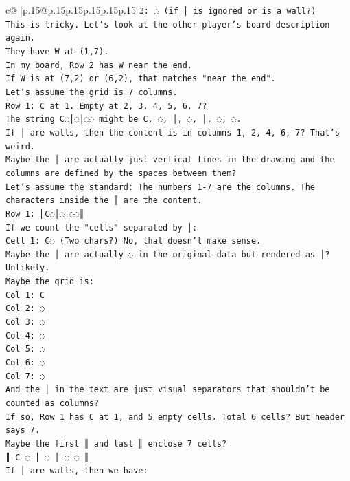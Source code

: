 \documentclass{article}
\begin{document}
{\begin{supertabular}{c@{$\;$}|p{.15\linewidth}@{}p{.15\linewidth}p{.15\linewidth}p{.15\linewidth}p{.15\linewidth}p{.15\linewidth}}
{{{\texttt{3: ◌ (if │ is ignored or is a wall?)} \\
\texttt{This is tricky. Let's look at the other player's board description again.} \\
\texttt{They have W at (1,7).} \\
\texttt{In my board, Row 2 has W near the end.} \\
\texttt{If W is at (7,2) or (6,2), that matches "near the end".} \\
\texttt{Let's assume the grid is 7 columns.} \\
\texttt{Row 1: C at 1. Empty at 2, 3, 4, 5, 6, 7?} \\
\texttt{The string C◌│◌│◌◌ might be C, ◌, │, ◌, │, ◌, ◌.} \\
\texttt{If │ are walls, then the content is in columns 1, 2, 4, 6, 7? That's weird.} \\
\texttt{Maybe the │ are actually just vertical lines in the drawing and the columns are defined by the spaces between them?} \\
\texttt{Let's assume the standard: The numbers 1{-}7 are the columns. The characters inside the ║ are the content.} \\
\texttt{Row 1: ║C◌│◌│◌◌║} \\
\texttt{If we count the "cells" separated by │:} \\
\texttt{Cell 1: C◌ (Two chars?) No, that doesn't make sense.} \\
\texttt{Maybe the │ are actually ◌ in the original data but rendered as │? Unlikely.} \\
\texttt{Maybe the grid is:} \\
\texttt{Col 1: C} \\
\texttt{Col 2: ◌} \\
\texttt{Col 3: ◌} \\
\texttt{Col 4: ◌} \\
\texttt{Col 5: ◌} \\
\texttt{Col 6: ◌} \\
\texttt{Col 7: ◌} \\
\texttt{And the │ in the text are just visual separators that shouldn't be counted as columns?} \\
\texttt{If so, Row 1 has C at 1, and 5 empty cells. Total 6 cells? But header says 7.} \\
\texttt{Maybe the first ║ and last ║ enclose 7 cells?} \\
\texttt{║ C ◌ │ ◌ │ ◌ ◌ ║} \\
\texttt{If │ are walls, then we have:} \\
}}}
\end{supertabular}}
\end{document}
